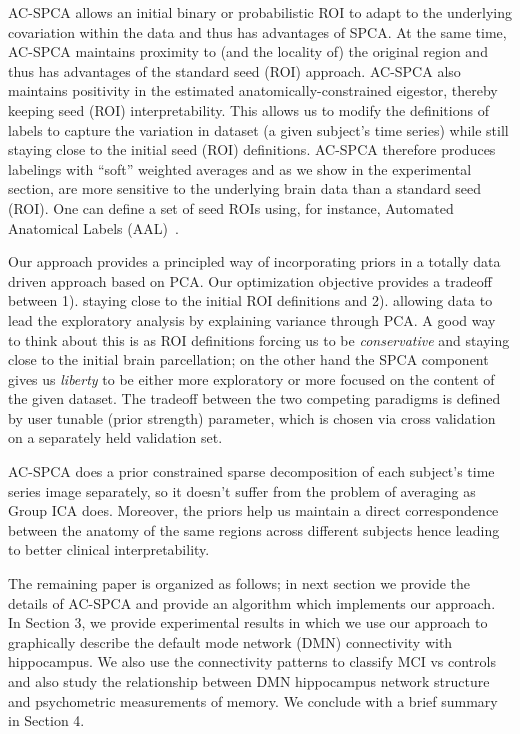 \documentclass{article}
\begin{document}
AC-SPCA allows an initial binary or probabilistic ROI to adapt to
the underlying covariation within the data and thus has advantages of
SPCA.  At the same time, AC-SPCA maintains proximity to (and the
locality of) the original region and thus has advantages of the
standard seed (ROI) approach.  AC-SPCA also maintains positivity in the
estimated anatomically-constrained eigestor, thereby keeping seed (ROI)
interpretability. This allows us to modify the definitions of labels to capture the variation in dataset (a given subject's time series) while still staying close to the initial seed (ROI) definitions. AC-SPCA therefore produces
labelings with ``soft'' weighted averages and as we show in the
experimental section, are more sensitive to the underlying
brain data than a standard seed (ROI). One can define a set of seed ROIs using, for instance, Automated Anatomical Labels (AAL)~\citep{tzourio2002automated}.

Our approach provides a principled way of incorporating priors in a totally data driven approach based on PCA. Our optimization objective provides a tradeoff between 1). staying close to the initial ROI definitions and 2). allowing data to lead the exploratory analysis by explaining variance through PCA. A good way to think about this is as ROI definitions forcing us to be {\em conservative} and staying close to the initial brain parcellation; on the other hand the SPCA component gives us {\em liberty} to be either more exploratory or more focused on the content of the given dataset. The tradeoff between the two competing paradigms is defined by user tunable (prior strength) parameter, which is chosen via cross validation on a separately held validation set. 

AC-SPCA does a prior constrained sparse decomposition of each subject's time series image separately, so it doesn't suffer from the problem of averaging as Group ICA does. Moreover, the priors help us maintain a direct correspondence between the anatomy of the same regions across different subjects hence leading to better clinical interpretability.

The remaining paper is organized as follows; in next section we provide the details of AC-SPCA and provide an algorithm which implements our approach. In Section 3, we provide experimental results in which we use our approach to graphically describe the default mode network (DMN) connectivity with hippocampus. We also use the connectivity patterns to classify MCI vs controls and also study the relationship between DMN hippocampus network structure and psychometric measurements of memory. We conclude with a brief summary in Section 4.
\end{document}
